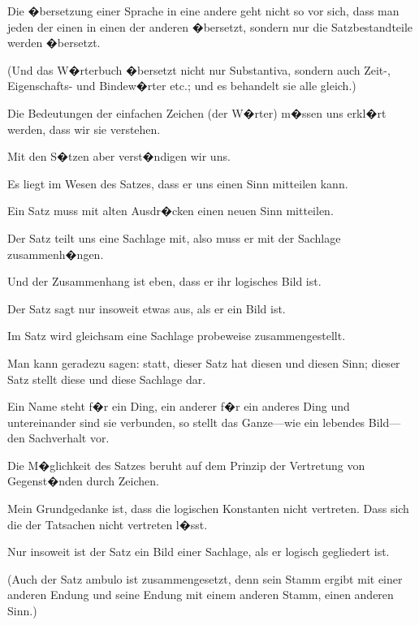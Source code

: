 {Die �bersetzung einer Sprache in eine andere
geht nicht so vor sich, dass man jeden  der
einen in einen  der anderen �bersetzt, sondern
nur die Satzbestandteile werden �bersetzt.

(Und das W�rterbuch �bersetzt nicht nur
Substantiva, sondern auch \mbox{Zeit-,} Eigenschafts- und
Bindew�rter etc.; und es behandelt sie alle gleich.)}


{Die Bedeutungen der einfachen Zeichen (der
W�rter) m�ssen uns erkl�rt werden, dass wir sie
verstehen.

Mit den S�tzen aber verst�ndigen wir uns.}


{Es liegt im Wesen des Satzes, dass er uns einen
 Sinn mitteilen kann.}


{Ein Satz muss mit alten Ausdr�cken einen
neuen Sinn mitteilen.

Der Satz teilt uns eine Sachlage mit, also
muss er  mit der Sachlage zusammenh�ngen.

Und der Zusammenhang ist eben, dass er ihr
logisches Bild ist.

Der Satz sagt nur insoweit etwas aus, als er ein
Bild ist.}


{Im Satz wird gleichsam eine Sachlage probeweise
zusammengestellt.

Man kann geradezu sagen: statt, dieser Satz
hat diesen und diesen Sinn; dieser Satz stellt diese
und diese Sachlage dar.}


{Ein Name steht f�r ein Ding, ein anderer f�r
ein anderes Ding und untereinander sind sie
verbunden, so stellt das Ganze---wie ein lebendes
Bild---den Sachverhalt vor.}


{Die M�glichkeit des Satzes beruht auf dem
Prinzip der Vertretung von Gegenst�nden durch
Zeichen.

{\stretchyspace
Mein Grundgedanke ist, dass die \glqq{}logischen
Konstanten\grqq{} nicht vertreten. Dass sich die 
der Tatsachen nicht vertreten l�sst.}}


{Nur insoweit ist der Satz ein Bild einer Sachlage,
als er logisch gegliedert ist.

(Auch der Satz \glqq{}ambulo\grqq{} ist zusammengesetzt,
denn sein Stamm ergibt mit einer anderen Endung
und seine Endung mit einem anderen Stamm, einen
anderen Sinn.)}


